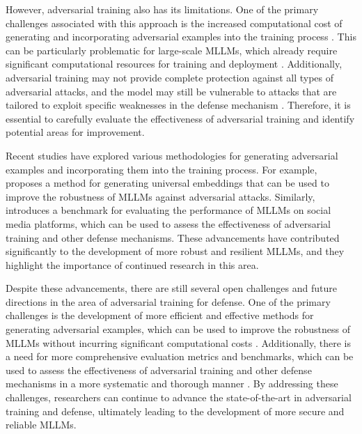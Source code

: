 \documentclass[11pt,a4paper]{article}
\begin{document}
However, adversarial training also has its limitations. One of the primary challenges associated with this approach is the increased computational cost of generating and incorporating adversarial examples into the training process \cite{doi:10.1109/tpami.2025.3532688}. This can be particularly problematic for large-scale MLLMs, which already require significant computational resources for training and deployment \cite{arxiv:2402.05935}. Additionally, adversarial training may not provide complete protection against all types of adversarial attacks, and the model may still be vulnerable to attacks that are tailored to exploit specific weaknesses in the defense mechanism \cite{arxiv:2402.02309}. Therefore, it is essential to carefully evaluate the effectiveness of adversarial training and identify potential areas for improvement.

Recent studies have explored various methodologies for generating adversarial examples and incorporating them into the training process. For example, \cite{arxiv:2407.12580} proposes a method for generating universal embeddings that can be used to improve the robustness of MLLMs against adversarial attacks. Similarly, \cite{arxiv:2402.14154} introduces a benchmark for evaluating the performance of MLLMs on social media platforms, which can be used to assess the effectiveness of adversarial training and other defense mechanisms. These advancements have contributed significantly to the development of more robust and resilient MLLMs, and they highlight the importance of continued research in this area.

Despite these advancements, there are still several open challenges and future directions in the area of adversarial training for defense. One of the primary challenges is the development of more efficient and effective methods for generating adversarial examples, which can be used to improve the robustness of MLLMs without incurring significant computational costs \cite{arxiv:2408.13257}. Additionally, there is a need for more comprehensive evaluation metrics and benchmarks, which can be used to assess the effectiveness of adversarial training and other defense mechanisms in a more systematic and thorough manner \cite{arxiv:2408.08632}. By addressing these challenges, researchers can continue to advance the state-of-the-art in adversarial training and defense, ultimately leading to the development of more secure and reliable MLLMs.
\end{document}
